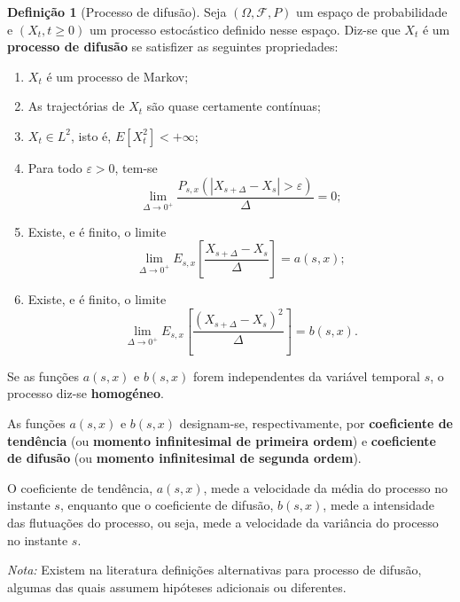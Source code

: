 \documentclass[
  11pt,
  a4paper,
]{book}
\theoremstyle{definition}
\newtheorem{definition}{Definição}[chapter]
\theoremstyle{definition}
\theoremstyle{definition}
\theoremstyle{definition}
\theoremstyle{remark}
\begin{document}
\begin{definition}[Processo de difusão]
Seja \((\Omega,\mathcal{F},P)\) um espaço de probabilidade e \((X_t, t \geq 0)\) um processo estocástico definido nesse espaço. Diz-se que \(X_t\) é um \textbf{processo de difusão} se satisfizer as seguintes propriedades:

\begin{enumerate}
\def\labelenumi{\roman{enumi})}
\item
  \(X_t\) é um processo de Markov;
\item
  As trajectórias de \(X_t\) são quase certamente contínuas;
\item
  \(X_t \in L^2\), isto é, \(E[X_t^2] < +\infty\);
\item
  Para todo \(\varepsilon > 0\), tem-se
  \[
  \lim_{\Delta \to 0^+} \frac{P_{s,x}(|X_{s+\Delta} - X_s| > \varepsilon)}{\Delta} = 0;
  \]
\item
  Existe, e é finito, o limite
  \[
  \lim_{\Delta \to 0^+} E_{s,x}\left[\frac{X_{s+\Delta} - X_s}{\Delta}\right] = a(s,x);
  \]
\item
  Existe, e é finito, o limite
  \[
  \lim_{\Delta \to 0^+} E_{s,x}\left[\frac{(X_{s+\Delta} - X_s)^2}{\Delta}\right] = b(s,x).
  \]
\end{enumerate}

Se as funções \(a(s,x)\) e \(b(s,x)\) forem independentes da variável temporal \(s\), o processo diz-se \textbf{homogéneo}.

As funções \(a(s,x)\) e \(b(s,x)\) designam-se, respectivamente, por \textbf{coeficiente de tendência} (ou \textbf{momento infinitesimal de primeira ordem}) e \textbf{coeficiente de difusão} (ou \textbf{momento infinitesimal de segunda ordem}).

O coeficiente de tendência, \(a(s,x)\), mede a velocidade da média do processo no instante \(s\), enquanto que o coeficiente de difusão, \(b(s,x)\), mede a intensidade das flutuações do processo, ou seja, mede a velocidade da variância do processo no instante \(s\).

\emph{Nota:} Existem na literatura definições alternativas para processo de difusão, algumas das quais assumem hipóteses adicionais ou diferentes.
\end{definition}

\(\,\)
\end{document}
